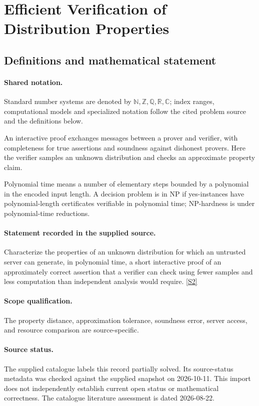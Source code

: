 \documentclass[11pt]{article}
\newcommand{\sref}[2]{\hyperlink{source:#1:#2}{[S#2]}}
\begin{document}
\section{Efficient Verification of Distribution Properties}\label{statement}

\subsection{Definitions and mathematical statement}

\paragraph{Shared notation.}Standard number systems are denoted by $\mathbb N,\mathbb Z,\mathbb Q,\mathbb R,\mathbb C$; index ranges, computational models and specialized notation follow the cited problem source and the definitions below.


An interactive proof exchanges messages between a prover and verifier, with completeness for true assertions and soundness against dishonest provers. Here the verifier samples an unknown distribution and checks an approximate property claim.

Polynomial time means a number of elementary steps bounded by a polynomial in the encoded input length. A decision problem is in $\mathrm{NP}$ if yes-instances have polynomial-length certificates verifiable in polynomial time; NP-hardness is under polynomial-time reductions.
\paragraph{Statement recorded in the supplied source.}
Characterize the properties of an unknown distribution for which an untrusted server can generate, in polynomial time, a short interactive proof of an approximately correct assertion that a verifier can check using fewer samples and less computation than independent analysis would require. \sref{statement}{2}
\paragraph{Scope qualification.}
The property distance, approximation tolerance, soundness error, server access, and resource comparison are source-specific.
\paragraph{Source status.}
The supplied catalogue labels this record partially solved. Its source-status metadata was checked against the supplied snapshot on 2026-10-11. This import does not independently establish current open status or mathematical correctness. The catalogue literature assessment is dated 2026-08-22.
\end{document}
